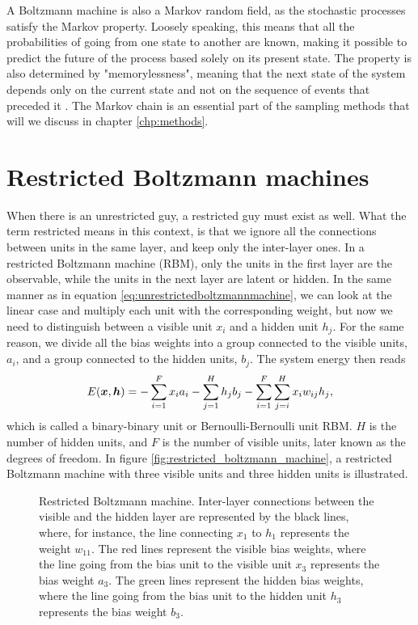 A Boltzmann machine is also a Markov random field, as the stochastic processes satisfy the Markov property. Loosely speaking, this means that all the probabilities of going from one state to another are known, making it possible to predict the future of the process based solely on its present state. The property is also determined by "memorylessness", meaning that the next state of the system depends only on the current state and not on the sequence of events that preceded it \supercite{fischer_training_2014}. The Markov chain is an essential part of the sampling methods that will we discuss in chapter \ref{chp:methods}.

\section{Restricted Boltzmann machines} \label{sec:RBM}
When there is an unrestricted guy, a restricted guy must exist as well. What the term restricted means in this context, is that we ignore all the connections between units in the same layer, and keep only the inter-layer ones. In a restricted Boltzmann machine (RBM), only the units in the first layer are the observable, while the units in the next layer are latent or hidden. In the same manner as in equation \eqref{eq:unrestrictedboltzmannmachine}, we can look at the linear case and multiply each unit with the corresponding weight, but now we need to distinguish between a visible unit $x_i$ and a hidden unit $h_j$. For the same reason, we divide all the bias weights into a group connected to the visible units, $a_i$, and a group connected to the hidden units, $b_j$. The system energy then reads
\begin{equation}
E(\boldsymbol{{x}},\boldsymbol{{h}})=- \sum_{i=1}^Fx_ia_i- \sum_{j=1}^Hh_jb_j-\sum_{i=1}^F\sum_{j=i}^H x_iw_{ij}h_j,
\label{eq:binarybinary}
\end{equation}
which is called a binary-binary unit or Bernoulli-Bernoulli unit RBM. $H$ is the number of hidden units, and $F$ is the number of visible units, later known as the degrees of freedom. In figure \eqref{fig:restricted_boltzmann_machine}, a restricted Boltzmann machine with three visible units and three hidden units is illustrated.

\begin{figure}
	\centering
	
	\caption{Restricted Boltzmann machine. Inter-layer connections between the visible and the hidden layer are represented by the black lines, where, for instance, the line connecting $x_1$ to $h_1$ represents the weight $w_{11}$. The \textcolor{color1}{red} lines represent the visible bias weights, where the line going from the bias unit to the visible unit $x_3$ represents the bias weight $a_3$. The \textcolor{color3}{green} lines represent the hidden bias weights, where the line going from the bias unit to the hidden unit $h_3$ represents the bias weight $b_3$.}
	\label{fig:restricted_boltzmann_machine}
\end{figure}

